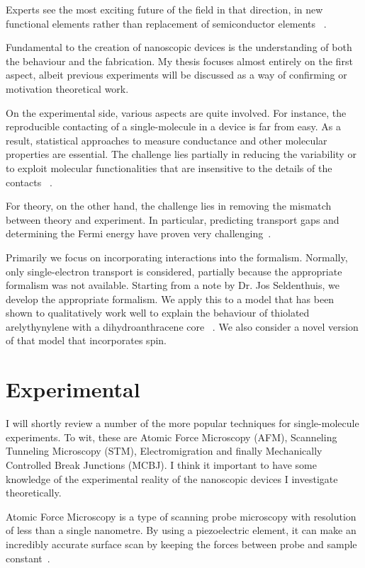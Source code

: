 Experts see the most exciting future of the field in that direction, in new functional elements rather than replacement of semiconductor elements ~\cite{visions}.

Fundamental to the creation of nanoscopic devices is the understanding of both the behaviour and the fabrication. My thesis focuses almost entirely on the first aspect, albeit previous experiments will be discussed as a way of confirming or motivation theoretical work.

On the experimental side, various aspects are quite involved. For instance, the reproducible contacting of a single-molecule in a device is far from easy. As a result, statistical approaches to measure conductance and other molecular properties are essential. The challenge lies partially in reducing the variability or to exploit molecular functionalities that are insensitive to the details of the contacts ~\cite{visions}.

For theory, on the other hand, the challenge lies in removing the mismatch between theory and experiment. In particular, predicting transport gaps and determining the Fermi energy have proven very challenging~\cite{perrin}. 

Primarily we focus on incorporating interactions into the formalism. Normally, only single-electron transport is considered, partially because the appropriate formalism  was not available. Starting from a note by Dr. Jos Seldenthuis, we develop the appropriate formalism. We apply this to a model that has been shown to qualitatively work well to explain the behaviour of thiolated arelythynylene with a dihydroanthracene core ~\cite{perrinnano}. We also consider a novel version of that model that incorporates spin. 
\section{Experimental}
I will shortly review a number of the more popular techniques for single-molecule experiments. To wit, these are Atomic Force Microscopy (AFM), Scanneling Tunneling Microscopy (STM), Electromigration and finally Mechanically Controlled Break Junctions (MCBJ). I think it important to have some knowledge of the experimental reality of the nanoscopic devices I investigate theoretically.

Atomic Force Microscopy is a type of scanning probe microscopy with resolution of less than a single nanometre. By using a piezoelectric element, it can make an incredibly accurate surface scan by keeping the forces between probe and sample constant~\cite{frei1, frei2}.

